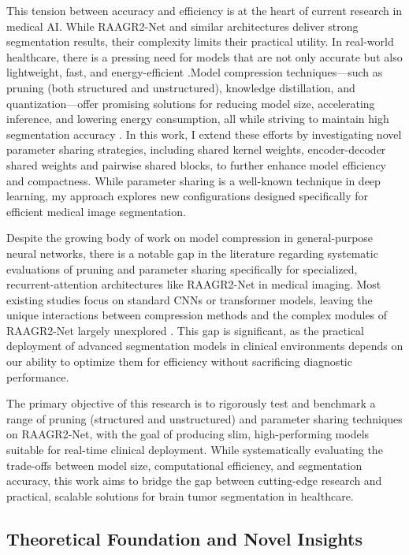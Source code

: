 \documentclass[12pt,a4paper]{article}
\begin{document}
This tension between accuracy and efficiency is at the heart of current research in medical AI. While RAAGR2-Net and similar architectures deliver strong segmentation results, their complexity limits their practical utility. In real-world healthcare, there is a pressing need for models that are not only accurate but also lightweight, fast, and energy-efficient \cite{Mazurek2024, Wu2023}.Model compression techniques—such as pruning (both structured and unstructured), knowledge distillation, and quantization—offer promising solutions for reducing model size, accelerating inference, and lowering energy consumption, all while striving to maintain high segmentation accuracy \cite{Mazurek2024, Wu2023, Jeong2021}. In this work, I extend these efforts by investigating novel parameter sharing strategies, including shared kernel weights, encoder-decoder shared weights and pairwise shared blocks, to further enhance model efficiency and compactness. While parameter sharing is a well-known technique in deep learning, my approach explores new configurations designed specifically for efficient medical image segmentation.

Despite the growing body of work on model compression in general-purpose neural networks, there is a notable gap in the literature regarding systematic evaluations of pruning and parameter sharing specifically for specialized, recurrent-attention architectures like RAAGR2-Net in medical imaging. Most existing studies focus on standard CNNs or transformer models, leaving the unique interactions between compression methods and the complex modules of RAAGR2-Net largely unexplored \cite{Mazurek2024, Jeong2021}. This gap is significant, as the practical deployment of advanced segmentation models in clinical environments depends on our ability to optimize them for efficiency without sacrificing diagnostic performance.

The primary objective of this research is to rigorously test and benchmark a range of pruning (structured and unstructured) and parameter sharing techniques on RAAGR2-Net, with the goal of producing slim, high-performing models suitable for real-time clinical deployment. While systematically evaluating the trade-offs between model size, computational efficiency, and segmentation accuracy, this work aims to bridge the gap between cutting-edge research and practical, scalable solutions for brain tumor segmentation in healthcare.

\subsection{Theoretical Foundation and Novel Insights}
\end{document}
